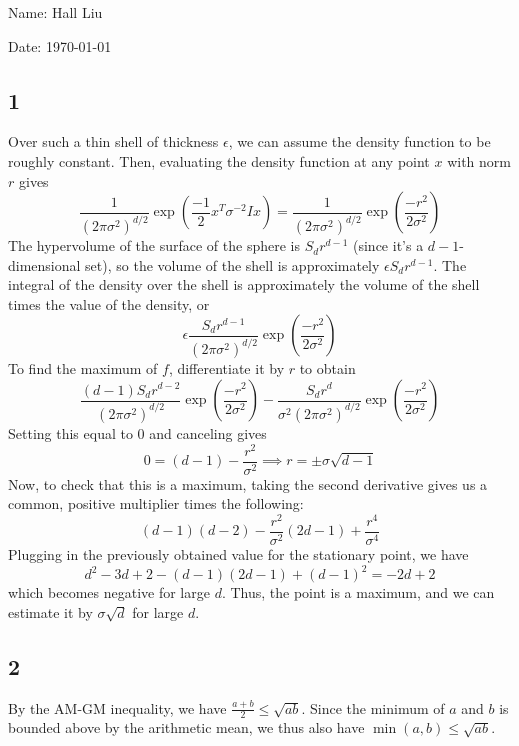 \documentclass{article}
\newcommand{\ep}{\epsilon}
\begin{document}
Name: Hall Liu

Date: \today 
\vspace{1.5cm}
\subsection*{1}
Over such a thin shell of thickness $\ep$, we can assume the density function to be roughly constant. Then, evaluating the density function at any point $x$ with norm $r$ gives
\[\frac{1}{(2\pi\sigma^2)^{d/2}}\exp\left(\frac{-1}{2}x^T\sigma^{-2}Ix\right)=\frac{1}{(2\pi\sigma^2)^{d/2}}\exp\left(\frac{-r^2}{2\sigma^2}\right)\]
The hypervolume of the surface of the sphere is $S_dr^{d-1}$ (since it's a $d-1$-dimensional set), so the volume of the shell is approximately $\ep S_dr^{d-1}$. The integral of the density over the shell is approximately the volume of the shell times the value of the density, or 
\[\ep\frac{S_dr^{d-1}}{(2\pi\sigma^2)^{d/2}}\exp\left(\frac{-r^2}{2\sigma^2}\right)\]
To find the maximum of $f$, differentiate it by $r$ to obtain
\[\frac{(d-1)S_dr^{d-2}}{(2\pi\sigma^2)^{d/2}}\exp\left(\frac{-r^2}{2\sigma^2}\right)-\frac{S_dr^d}{\sigma^2(2\pi\sigma^2)^{d/2}}\exp\left(\frac{-r^2}{2\sigma^2}\right)\]
Setting this equal to $0$ and canceling gives
\[0=(d-1)-\frac{r^2}{\sigma^2}\implies r=\pm\sigma\sqrt{d-1}\]
Now, to check that this is a maximum, taking the second derivative gives us a common, positive multiplier times the following:
\[(d-1)(d-2)-\frac{r^2}{\sigma^2}(2d-1)+\frac{r^4}{\sigma^4}\]
Plugging in the previously obtained value for the stationary point, we have
\[d^2-3d+2-(d-1)(2d-1)+(d-1)^2=-2d+2\]
which becomes negative for large $d$. Thus, the point is a maximum, and we can estimate it by $\sigma\sqrt{d}$ for large $d$.
\subsection{2}
By the AM-GM inequality, we have $\frac{a+b}{2}\leq\sqrt{ab}$. Since the minimum of $a$ and $b$ is bounded above by the arithmetic mean, we thus also have $\min(a,b)\leq\sqrt{ab}$. 
\end{document}
